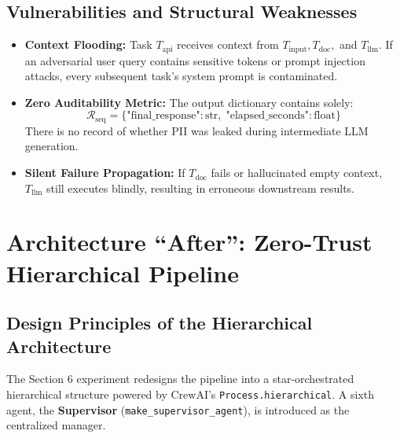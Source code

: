 \documentclass[10pt,a4paper]{article}
\begin{document}
\subsection{Vulnerabilities and Structural Weaknesses}
\begin{itemize}
    \item \textbf{Context Flooding:} Task $T_{\text{api}}$ receives context from $T_{\text{input}}, T_{\text{doc}},$ and $T_{\text{llm}}$. If an adversarial user query contains sensitive tokens or prompt injection attacks, every subsequent task's system prompt is contaminated.
    \item \textbf{Zero Auditability Metric:} The output dictionary contains solely:
    \begin{equation}
        \mathcal{R}_{\text{seq}} = \{\text{"final\_response"}: \text{str}, \; \text{"elapsed\_seconds"}: \text{float}\}
    \end{equation}
    There is no record of whether PII was leaked during intermediate LLM generation.
    \item \textbf{Silent Failure Propagation:} If $T_{\text{doc}}$ fails or hallucinated empty context, $T_{\text{llm}}$ still executes blindly, resulting in erroneous downstream results.
\end{itemize}

\section{Architecture ``After'': Zero-Trust Hierarchical Pipeline}

\subsection{Design Principles of the Hierarchical Architecture}
The Section 6 experiment redesigns the pipeline into a star-orchestrated hierarchical structure powered by CrewAI's \texttt{Process.hierarchical}. A sixth agent, the \textbf{Supervisor} (\texttt{make\_supervisor\_agent}), is introduced as the centralized manager.
\end{document}
